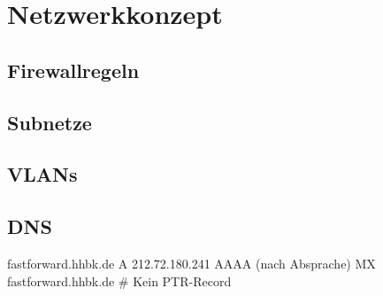 \section{Netzwerkkonzept}

\subsection{Firewallregeln}

\subsection{Subnetze}

\subsection{VLANs}

\subsection{DNS}

fastforward.hhbk.de
	A	212.72.180.241
	AAAA	(nach Absprache)
	MX	fastforward.hhbk.de
	# Kein PTR-Record
